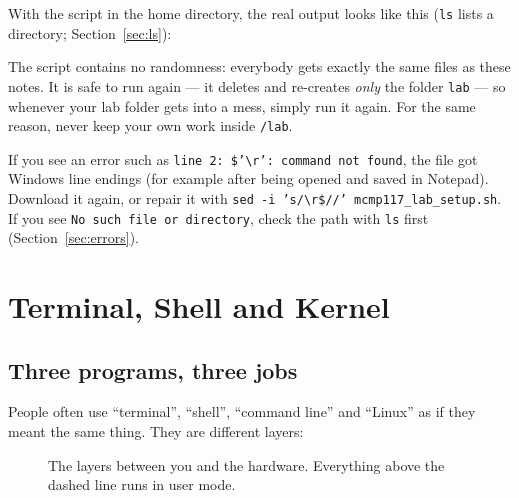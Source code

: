 \documentclass[11pt,a4paper]{article}
\newcommand{\cmd}[1]{\texttt{#1}}
\begin{document}
With the script in the home directory, the real output looks like this (\cmd{ls} lists a directory; Section~\ref{sec:ls}):

The script contains no randomness: everybody gets exactly the same files as these notes. It is safe to run again --- it deletes and re-creates \emph{only} the folder \texttt{lab} --- so whenever your lab folder gets into a mess, simply run it again. For the same reason, never keep your own work inside \texttt{\tl/lab}.

\begin{tryit}
If you see an error such as \texttt{line 2: \$'\textbackslash r': command not found}, the file got Windows line endings (for example after being opened and saved in Notepad). Download it again, or repair it with \cmd{sed -i 's/\textbackslash r\$//' mcmp117\_lab\_setup.sh}. If you see \texttt{No such file or directory}, check the path with \cmd{ls} first (Section~\ref{sec:errors}).
\end{tryit}

\section{Terminal, Shell and Kernel}

\subsection{Three programs, three jobs}

People often use ``terminal'', ``shell'', ``command line'' and ``Linux'' as if they meant the same thing. They are different layers:

\begin{figure}[H]
\centering
{}
\caption{The layers between you and the hardware. Everything above the dashed line runs in user mode.}
\end{figure}
\end{document}
